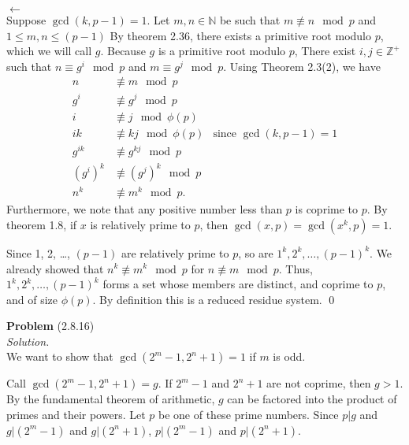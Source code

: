 \documentclass[12 pt]{amsart}
\begin{document}
  \noindent
  $\longleftarrow$ \\
  Suppose $\gcd(k, p-1) = 1$.
  Let $m, n \in \mathbb{N}$ be such that
  $m \not \equiv n \mod p$
  and $1 \leq m,n \leq (p-1)$
  By theorem 2.36, there exists a primitive root modulo $p$, 
  which we will call $g$.
  Because $g$ is a primitive root modulo $p$,
  There exist $i, j \in \mathbb{Z}^+$ such that 
  $n \equiv g^i \mod p$ and 
  $m \equiv g^j \mod p$.
  Using Theorem 2.3(2), we have
  \begin{align*}
    n &\not \equiv m \mod p \\
    g^i &\not \equiv g^j \mod p \\
    i &\not \equiv j \mod \phi(p) \\
    ik &\not \equiv kj \mod \phi(p)  & \text{since $\gcd(k, p-1) = 1$}\\
    g^{ik} &\not \equiv g^{kj} \mod p \\
    \left( g^i \right)^k &\not \equiv \left( g^j \right)^k \mod p \\
    n^k &\not \equiv m^k \mod p.
  \end{align*}
  Furthermore, we note that any positive number
  less than $p$ is coprime to $p$.
  By theorem 1.8, if $x$ is relatively prime to
  $p$, then $\gcd(x,p) = \gcd(x^k, p) = 1$.

  Since 1, 2, \ldots, $(p-1)$ are relatively prime to $p$, 
  so are $1^k, 2^k, \ldots, (p-1)^k$. 
  We already showed that $n^k \not \equiv m^k \mod p$ for
  $n \not \equiv m \mod p$. 
  Thus, $1^k, 2^k, \ldots, (p-1)^k$ forms a set whose members
  are distinct, and coprime to $p$, and of size $\phi(p)$.
  By definition this is a reduced residue system. 
  \qed
\vfill
\newpage



\phantom{\quad} \vfill
\noindent
\textbf{Problem} (2.8.16) \\[4ex]
\emph{Solution.} \\[2ex]
  We want to show that
  $\gcd(2^m-1, 2^n+1) = 1$ if $m$ is odd.

  Call $\gcd(2^m - 1, 2^n + 1) = g$.
  If $2^m - 1$ and $2^n + 1$ are not coprime,
  then $g > 1$. 
  By the fundamental theorem of arithmetic, 
  $g$ can be factored into the product of primes
  and their powers. 
  Let $p$ be one of these prime numbers.
  Since $p | g$ and 
  $g | (2^m - 1)$ and
  $g | (2^n + 1)$, 
  $p| (2^m - 1)$ and
  $p | (2^n + 1)$.
\end{document}
